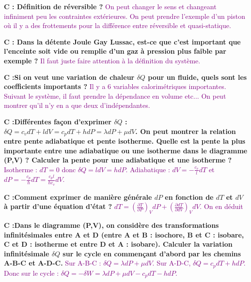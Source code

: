 \documentclass[french, a4paper, 10pt, twocolumn, landscape]{article}
\begin{document}
{  \textbf{C : Définition de réversible ?}  \textcolor{purple}{On peut changer le sens et changeant infiniment peu les contraintes extérieures. On peut prendre l'exemple d'un piston où il y a des frottements pour la différence entre réversible et quasi-statique.} \newline
  
  \textbf{C : Dans la détente Joule Gay Lussac, est-ce que c'est important que l'enceinte soit vide ou remplie d'un gaz à pression plus faible par exemple ?}  \textcolor{purple}{Il faut juste faire attention à la définition du système. } \newline
  
  \textbf{C :Si on veut une variation de chaleur $\delta Q$ pour un fluide, quels sont les coefficients importants ?}  \textcolor{purple}{Il y a 6 variables calorimétriques importantes. Suivant le système, il faut prendre la dépendance en volume etc... On peut montrer qu'il n'y en a que deux d'indépendantes.} \newline
  
  \textbf{C :Différentes façon d'exprimer $\delta Q$ : $\delta Q = c_vdT + ldV = c_pdT + hdP = \lambda dP + \mu dV$. On peut montrer la relation entre pente adiabatique et pente isotherme. Quelle est la pente la plus importante entre une adiabatique ou une isotherme dans le diagramme (P,V) ? Calculer la pente pour une adiabatique et une isotherme ? }  \textcolor{purple}{Isotherme : $dT=0$ donc $\delta Q= ldV = hdP$. Adiabatique : $dV = -\frac{c_v}{l}dT$ et $dP = -\frac{c_p}{h}dT= \frac{c_pl}{hc_v}dV$.} \newline
  
  \textbf{C :Comment exprimer de manière générale $dP$ en fonction de $dT$ et $dV$ à partir d'une équation d'état ?}  \textcolor{purple}{$dT = (\frac{\partial{T}}{\partial{P}})_VdP + (\frac{\partial{d}T}{\partial{d}V})_VdV$. On en déduit } \newline
  
  \textbf{C :Dans le diagramme (P,V), on considère des transformations infinitésimales entre A et D (entre A et B : isochore, B et C : isobare, C et D : isotherme et entre D et A : isobare). Calculer la variation infinitésimale $\delta Q$ sur le cycle en commençant d'abord par les chemins A-B-C et A-D-C.}  \textcolor{purple}{Sur A-B-C : $\delta Q = \lambda dP + \mu dV$. Sur A-D-C, $\delta Q = c_pdT + hdP$. Donc sur le cycle : $\delta Q = -\delta W = \lambda dP + \mu dV - c_pdT - hdP$. } \newline
}
\end{document}
